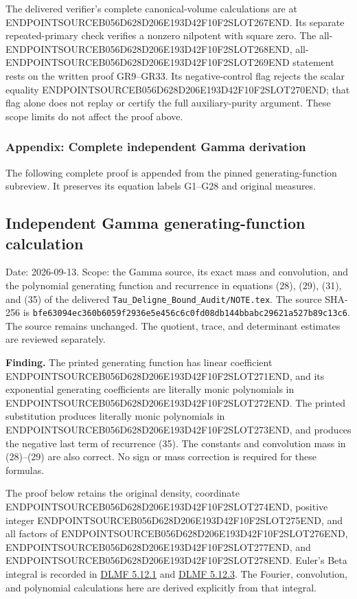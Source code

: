 The delivered verifier's complete canonical-volume calculations are at ENDPOINTSOURCEB056D628D206E193D42F10F2SLOT267END. Its separate repeated-primary check verifies a nonzero nilpotent with square zero. The all-ENDPOINTSOURCEB056D628D206E193D42F10F2SLOT268END, all-ENDPOINTSOURCEB056D628D206E193D42F10F2SLOT269END statement rests on the written proof GR9--GR33. Its negative-control flag rejects the scalar equality ENDPOINTSOURCEB056D628D206E193D42F10F2SLOT270END; that flag alone does not replay or certify the full auxiliary-purity argument. These scope limits do not affect the proof above.

\subsubsection{Appendix: Complete independent Gamma derivation}\label{endpoint-gamma_review--appendix-complete-independent-gamma-derivation}

The following complete proof is appended from the pinned generating-function subreview. It preserves its equation labels G1--G28 and original measures.

\subsection{Independent Gamma generating-function calculation}\label{endpoint-gamma_review--independent-gamma-generating-function-calculation}

Date: 2026-09-13. Scope: the Gamma source, its exact mass and convolution, and the polynomial generating function and recurrence in equations (28), (29), (31), and (35) of the delivered \texttt{Tau\_Deligne\_Bound\_Audit/NOTE.tex}. The source SHA-256 is \texttt{bfe63094ec360b6059f2936e5e456c6c0fd08db144bbabc29621a527b89c13c6}. The source remains unchanged. The quotient, trace, and determinant estimates are reviewed separately.

\textbf{Finding.} The printed generating function has linear coefficient ENDPOINTSOURCEB056D628D206E193D42F10F2SLOT271END, and its exponential generating coefficients are literally monic polynomials in ENDPOINTSOURCEB056D628D206E193D42F10F2SLOT272END. The printed substitution produces literally monic polynomials in ENDPOINTSOURCEB056D628D206E193D42F10F2SLOT273END, and produces the negative last term of recurrence (35). The constants and convolution mass in (28)--(29) are also correct. No sign or mass correction is required for these formulas.

The proof below retains the original density, coordinate ENDPOINTSOURCEB056D628D206E193D42F10F2SLOT274END, positive integer ENDPOINTSOURCEB056D628D206E193D42F10F2SLOT275END, and all factors of ENDPOINTSOURCEB056D628D206E193D42F10F2SLOT276END, ENDPOINTSOURCEB056D628D206E193D42F10F2SLOT277END, and ENDPOINTSOURCEB056D628D206E193D42F10F2SLOT278END. Euler's Beta integral is recorded in \href{https://dlmf.nist.gov/5.12.E1}{DLMF 5.12.1} and \href{https://dlmf.nist.gov/5.12.E3}{DLMF 5.12.3}. The Fourier, convolution, and polynomial calculations here are derived explicitly from that integral.

